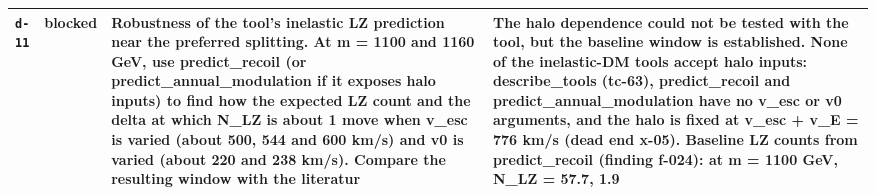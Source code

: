 \documentclass[11pt,a4paper]{article}
\begin{document}
\begin{longtable}{@{}p{}p{}p{}p{}@{}}
\texttt{d-11} & blocked & Robustness of the tool's inelastic LZ prediction near the preferred splitting. At m = 1100 and 1160 GeV, use predict\_recoil (or predict\_annual\_modulation if it exposes halo inputs) to find how the expected LZ count and the delta at which N\_LZ is about 1 move when v\_esc is varied (about 500, 544 and 600 km/s) and v0 is varied (about 220 and 238 km/s). Compare the resulting window with the literatur & The halo dependence could not be tested with the tool, but the baseline window is established. None of the inelastic-DM tools accept halo inputs: describe\_tools (tc-63), predict\_recoil and predict\_annual\_modulation have no v\_esc or v0 arguments, and the halo is fixed at v\_esc + v\_E = 776 km/s (dead end x-05). Baseline LZ counts from predict\_recoil (finding f-024): at m = 1100 GeV, N\_LZ = 57.7, 1.9 \\
\bottomrule\end{longtable}
\end{document}
